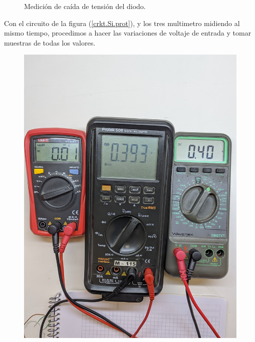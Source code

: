 \documentclass[chaptersright]{informeutn}
\begin{document}
\begin{figure}[H]
\begin{minipage}{0.3\textwidth}
          \caption{Medición de caída de tensión del diodo.}
          \label{crkt.Si.mult.vd}
        \end{minipage}
      \end{figure}

      Con el circuito de la figura (\ref{crkt.Si.prot}), y los tres multimetro midiendo al mismo tiempo, procedimos a
      hacer las variaciones de voltaje de entrada y tomar muestras de todas los valores.

      \begin{figure}[!ht]
        \centering
        \begin{minipage}{0.25\textwidth}
          \includegraphics[width=1\textwidth]{pictures/mult_crkt-1_03.jpg}
        \end{minipage}
        \begin{minipage}{0.25\textwidth}

\end{minipage}
\end{figure}
\end{document}
